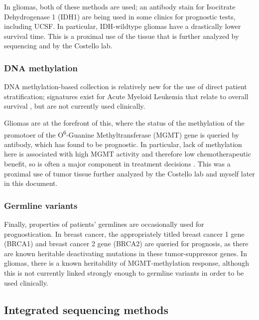       In gliomas, both of these methods are used; an antibody stain for Isocitrate Dehydrogenase 1
      (IDH1) are being used in some clinics for prognostic tests,
      including UCSF. In particular, IDH-wildtype gliomas have a
      drastically lower survival time.
      This is a proximal use of the tissue that is
      further analyzed by sequencing and by the Costello lab. 

      \subsubsection{DNA methylation}

      DNA methylation-based collection is relatively new for the use
      of direct patient stratification; signatures exist for Acute
      Myeloid Leukemia that relate to overall survival
      \cite{figueroa_dna_2010}, but are not currently used
      clinically. 

      Gliomas are at the forefront of this, where the
      status of the methylation of the promotoer of the
      O\textsuperscript{6}-Guanine Methyltransferase (MGMT) gene is
     queried by antibody, which has found to be prognostic. In particular, lack of
      methylation here is associated with high MGMT activity and
      therefore low chemotherapeutic benefit, so is often a major
      component in treatment decisions \cite{rapkins_mgmt_2015}. This
      was a proximal use of tumor tissue further analyzed by the
      Costello lab and myself later in this document.


      \subsubsection{Germline variants}
      Finally, properties of patients' germlines are occasionally used
      for prognostication. In breast cancer, the appropriately titled
      breast cancer 1 gene (BRCA1) and breast cancer 2 gene (BRCA2)
      are queried for prognosis, as there are known heritable
      deactivating mutations in these tumor-suppressor genes. In
      gliomas, there is a known heritability of MGMT-methylation
      response, although this is not currently linked strongly enough
      to germline variants in order to be used clinically.

      \subsection{Integrated sequencing methods}

